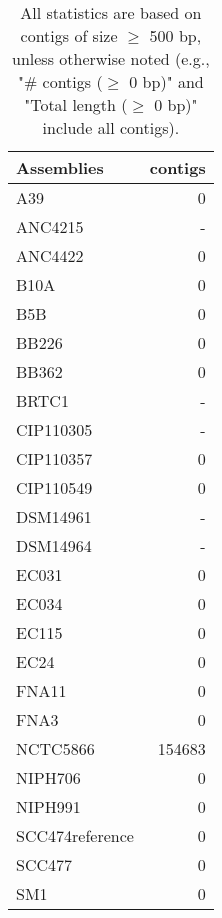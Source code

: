 \documentclass[12pt,a4paper]{article}
\begin{document}
\begin{table}[ht]
\begin{center}
\caption{All statistics are based on contigs of size $\geq$ 500 bp, unless otherwise noted (e.g., "\# contigs ($\geq$ 0 bp)" and "Total length ($\geq$ 0 bp)" include all contigs).}
\begin{tabular}{|l*{1}{|r}|}
\hline
Assemblies & contigs \\ \hline
A39 & 0 \\ \hline
ANC4215 & - \\ \hline
ANC4422 & 0 \\ \hline
B10A & 0 \\ \hline
B5B & 0 \\ \hline
BB226 & 0 \\ \hline
BB362 & 0 \\ \hline
BRTC1 & - \\ \hline
CIP110305 & - \\ \hline
CIP110357 & 0 \\ \hline
CIP110549 & 0 \\ \hline
DSM14961 & - \\ \hline
DSM14964 & - \\ \hline
EC031 & 0 \\ \hline
EC034 & 0 \\ \hline
EC115 & 0 \\ \hline
EC24 & 0 \\ \hline
FNA11 & 0 \\ \hline
FNA3 & 0 \\ \hline
NCTC5866 & 154683 \\ \hline
NIPH706 & 0 \\ \hline
NIPH991 & 0 \\ \hline
SCC474reference & 0 \\ \hline
SCC477 & 0 \\ \hline
SM1 & 0 \\ \hline
\end{tabular}
\end{center}
\end{table}
\end{document}
